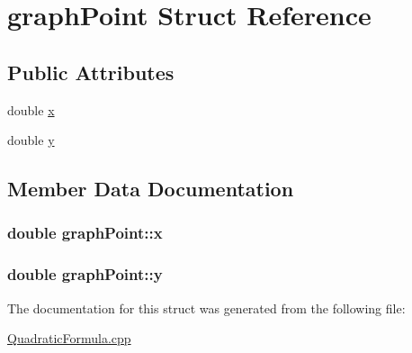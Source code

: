\hypertarget{structgraphPoint}{}\section{graph\+Point Struct Reference}
\label{structgraphPoint}
\subsection*{Public Attributes}
\begin{DoxyCompactItemize}
\item 
double \hyperlink{structgraphPoint_a49dfdf1225bd73da89c1b454cdd1ae84}{x}
\item 
double \hyperlink{structgraphPoint_a7b34c65aec2d9df8647e6215060cb9be}{y}
\end{DoxyCompactItemize}


\subsection{Member Data Documentation}
\subsubsection[{\texorpdfstring{x}{x}}]{\setlength{\rightskip}{0pt plus 5cm}double graph\+Point\+::x}\hypertarget{structgraphPoint_a49dfdf1225bd73da89c1b454cdd1ae84}{}\label{structgraphPoint_a49dfdf1225bd73da89c1b454cdd1ae84}
\subsubsection[{\texorpdfstring{y}{y}}]{\setlength{\rightskip}{0pt plus 5cm}double graph\+Point\+::y}\hypertarget{structgraphPoint_a7b34c65aec2d9df8647e6215060cb9be}{}\label{structgraphPoint_a7b34c65aec2d9df8647e6215060cb9be}


The documentation for this struct was generated from the following file\+:\begin{DoxyCompactItemize}
\item 
\hyperlink{QuadraticFormula_8cpp}{Quadratic\+Formula.\+cpp}\end{DoxyCompactItemize}
